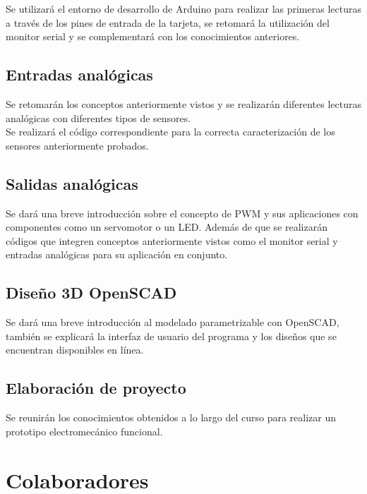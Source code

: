 \documentclass[]{article}
\begin{document}
Se utilizará el entorno de desarrollo de Arduino para realizar las primeras lecturas a través de los pines de entrada de la tarjeta, se retomará la utilización del monitor serial y se complementará con los conocimientos anteriores.\\

\subsection{Entradas analógicas}\label{subcap:EntAnalog}

Se retomarán los conceptos anteriormente vistos y se realizarán diferentes lecturas analógicas con diferentes tipos de sensores.\\

Se realizará el código correspondiente para la correcta caracterización de los sensores anteriormente probados.\\

\subsection{Salidas analógicas}\label{subcap:SalAnalog}

Se dará una breve introducción sobre el concepto de PWM y sus aplicaciones con componentes como un servomotor o un LED. Además de que se realizarán códigos que integren conceptos anteriormente vistos como el monitor serial y entradas analógicas para su aplicación en conjunto.\\

\subsection{Diseño 3D OpenSCAD}\label{subcap:OpenSCAD}

Se dará una breve introducción al modelado parametrizable con OpenSCAD, también se explicará la interfaz de usuario del programa y los diseños que se encuentran disponibles en línea.\\ 

\subsection{Elaboración de proyecto}\label{subcap:Proyecto}

Se reunirán los conocimientos obtenidos a lo largo del curso para realizar un prototipo electromecánico funcional.


\section{Colaboradores}
\end{document}
